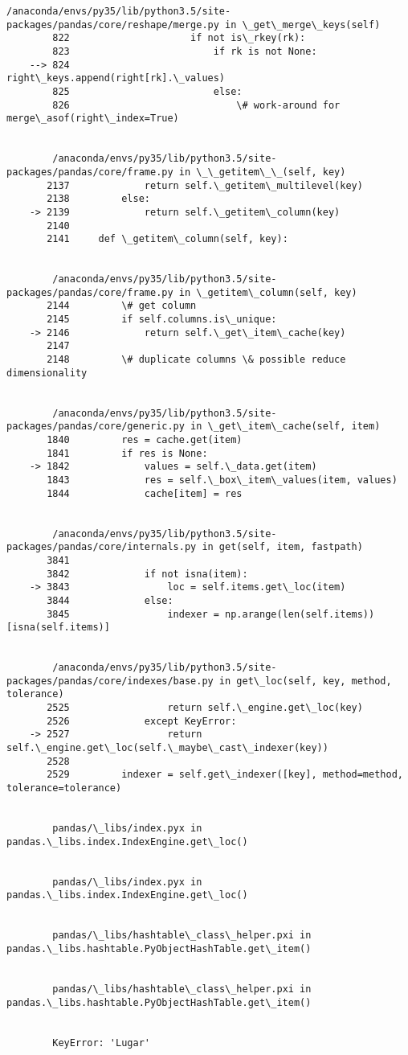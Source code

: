 \documentclass[11pt]{article}
\begin{document}
\begin{Verbatim}[commandchars=\\\{\}]
        /anaconda/envs/py35/lib/python3.5/site-packages/pandas/core/reshape/merge.py in \_get\_merge\_keys(self)
        822                     if not is\_rkey(rk):
        823                         if rk is not None:
    --> 824                             right\_keys.append(right[rk].\_values)
        825                         else:
        826                             \# work-around for merge\_asof(right\_index=True)


        /anaconda/envs/py35/lib/python3.5/site-packages/pandas/core/frame.py in \_\_getitem\_\_(self, key)
       2137             return self.\_getitem\_multilevel(key)
       2138         else:
    -> 2139             return self.\_getitem\_column(key)
       2140 
       2141     def \_getitem\_column(self, key):


        /anaconda/envs/py35/lib/python3.5/site-packages/pandas/core/frame.py in \_getitem\_column(self, key)
       2144         \# get column
       2145         if self.columns.is\_unique:
    -> 2146             return self.\_get\_item\_cache(key)
       2147 
       2148         \# duplicate columns \& possible reduce dimensionality


        /anaconda/envs/py35/lib/python3.5/site-packages/pandas/core/generic.py in \_get\_item\_cache(self, item)
       1840         res = cache.get(item)
       1841         if res is None:
    -> 1842             values = self.\_data.get(item)
       1843             res = self.\_box\_item\_values(item, values)
       1844             cache[item] = res


        /anaconda/envs/py35/lib/python3.5/site-packages/pandas/core/internals.py in get(self, item, fastpath)
       3841 
       3842             if not isna(item):
    -> 3843                 loc = self.items.get\_loc(item)
       3844             else:
       3845                 indexer = np.arange(len(self.items))[isna(self.items)]


        /anaconda/envs/py35/lib/python3.5/site-packages/pandas/core/indexes/base.py in get\_loc(self, key, method, tolerance)
       2525                 return self.\_engine.get\_loc(key)
       2526             except KeyError:
    -> 2527                 return self.\_engine.get\_loc(self.\_maybe\_cast\_indexer(key))
       2528 
       2529         indexer = self.get\_indexer([key], method=method, tolerance=tolerance)


        pandas/\_libs/index.pyx in pandas.\_libs.index.IndexEngine.get\_loc()


        pandas/\_libs/index.pyx in pandas.\_libs.index.IndexEngine.get\_loc()


        pandas/\_libs/hashtable\_class\_helper.pxi in pandas.\_libs.hashtable.PyObjectHashTable.get\_item()


        pandas/\_libs/hashtable\_class\_helper.pxi in pandas.\_libs.hashtable.PyObjectHashTable.get\_item()


        KeyError: 'Lugar'

    \end{Verbatim}


    
    
    
    
\end{document}
